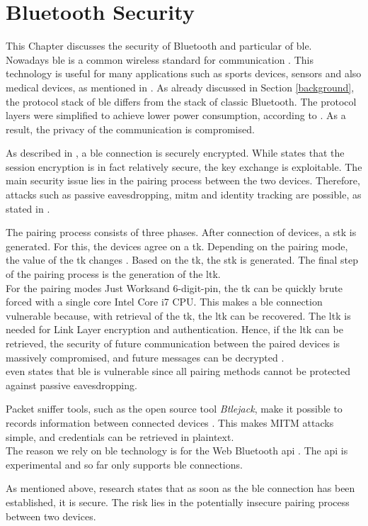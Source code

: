 \section{Bluetooth Security} \label{bluetooth}
This Chapter discusses the security of Bluetooth and particular of \gls{ble}. \\
Nowadays \gls{ble} is a common wireless standard for communication \cite{IntroductionBLE}. This technology is useful for many applications such as sports devices, sensors and also medical devices, as mentioned in \cite{Ryan13}.
As already discussed in Section \ref{background}, the protocol stack of \gls{ble} differs from the stack of classic Bluetooth. The protocol layers were simplified to achieve lower power consumption, according to \cite{Ryan13}. As a result, the privacy of the communication is compromised.

As described in \cite{GomezOP12}, a \gls{ble} connection is securely encrypted. While \cite{Ryan13} states that the session encryption is in fact relatively secure, the key exchange is exploitable. The main security issue lies in the pairing process between the two devices. Therefore, attacks such as passive eavesdropping, \gls{mitm} and identity tracking are possible, as stated in \cite{IntroductionBLE}.

The pairing process consists of three phases. After connection of devices, a \gls{stk} is generated. For this, the devices agree on a \gls{tk}. Depending on the pairing mode, the value of the \gls{tk} changes \cite{Ryan13}. Based on the \gls{tk}, the \gls{stk} is generated. The final step of the pairing process is the generation of the \gls{ltk}. \\
For the pairing modes Just Works\texttrademark and 6-digit-pin, the \gls{tk} can be quickly brute forced with a single core Intel Core i7 CPU. This makes a \gls{ble} connection vulnerable because, with retrieval of the \gls{tk}, the \gls{ltk} can be recovered. The \gls{ltk} is needed for Link Layer encryption and authentication. Hence, if the \gls{ltk} can be retrieved, the security of future communication between the paired devices is massively compromised, and future messages can be decrypted \cite{Ryan13}. \\
\cite{GomezOP12} even states that \gls{ble} is vulnerable since all pairing methods cannot be protected against passive eavesdropping. 

Packet sniffer tools, such as the open source tool \textit{Btlejack}, make it possible to records information between connected devices \cite{BtleJack}. This makes MITM attacks simple, and credentials can be retrieved in plaintext. \\
The reason we rely on \gls{ble} technology is for the Web Bluetooth \gls{api} \cite{WebBTAPI}. The \gls{api} is experimental and so far only supports \gls{ble} connections. 

As mentioned above, research \cite{Ryan13} states that as soon as the \gls{ble} connection has been established, it is secure. The risk lies in the potentially insecure pairing process between two devices.
